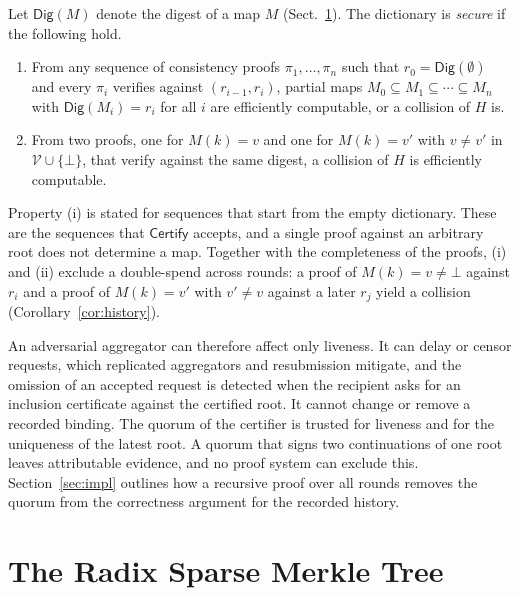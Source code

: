 \documentclass[runningheads]{llncs}
\newcommand{\Certify}{\mathsf{Certify}}
\newcommand{\V}{\mathcal{V}}
\begin{document}
\begin{definition}[Security]\label{def:security}
Let $\mathsf{Dig}(M)$ denote the digest of a map $M$ (Sect.~\ref{sec:rsmt}). The dictionary is \emph{secure} if the following hold.
\begin{enumerate}
\renewcommand{\labelenumi}{(\roman{enumi})}
  \item From any sequence of consistency proofs $\pi_1,\ldots,\pi_n$ such that $r_0 = \mathsf{Dig}(\emptyset)$ and every $\pi_i$ verifies against $(r_{i-1}, r_i)$, partial maps $M_0 \subseteq M_1 \subseteq \cdots \subseteq M_n$ with $\mathsf{Dig}(M_i) = r_i$ for all $i$ are efficiently computable, or a collision of $H$ is.
  \item From two proofs, one for $M(k) = v$ and one for $M(k) = v'$ with $v \neq v'$ in $\V \cup \{\bot\}$, that verify against the same digest, a collision of $H$ is efficiently computable.
\end{enumerate}
\end{definition}

Property (i) is stated for sequences that start from the empty dictionary. These are the sequences that $\Certify$ accepts, and a single proof against an arbitrary root does not determine a map. Together with the completeness of the proofs, (i) and (ii) exclude a double-spend across rounds: a proof of $M(k) = v \neq \bot$ against $r_i$ and a proof of $M(k) = v'$ with $v' \neq v$ against a later $r_j$ yield a collision (Corollary~\ref{cor:history}).

An adversarial aggregator can therefore affect only liveness. It can delay or censor requests, which replicated aggregators and resubmission mitigate, and the omission of an accepted request is detected when the recipient asks for an inclusion certificate against the certified root. It cannot change or remove a recorded binding. The quorum of the certifier is trusted for liveness and for the uniqueness of the latest root. A quorum that signs two continuations of one root leaves attributable evidence, and no proof system can exclude this. Section~\ref{sec:impl} outlines how a recursive proof over all rounds removes the quorum from the correctness argument for the recorded history.

\section{The Radix Sparse Merkle Tree}\label{sec:rsmt}
\end{document}

